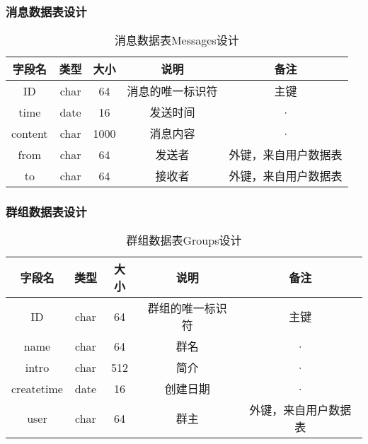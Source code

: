 \subsubsection{消息数据表设计}
\begin{table}[htbp]
	\centering
	\caption{消息数据表Messages设计} \label{tab:message-database}
	\begin{tabular}{|c|c|c|c|c|}
		\hline
		字段名  & 类型 & 大小 & 说明             & 备注                 \\
		\hline
		ID      & char & 64   & 消息的唯一标识符 & 主键                 \\
		\hline
		time    & date & 16   & 发送时间         & ·                    \\
		\hline
		content & char & 1000 & 消息内容         & ·                    \\
		\hline
		from    & char & 64   & 发送者           & 外键，来自用户数据表 \\
		\hline
		to      & char & 64   & 接收者           & 外键，来自用户数据表 \\
		\hline
	\end{tabular}
\end{table}


\subsubsection{群组数据表设计}
\begin{table}[htbp]
	\centering
	\caption{群组数据表Groups设计} \label{tab:group-database}
	\begin{tabular}{|c|c|c|c|c|}
		\hline
		字段名     & 类型 & 大小 & 说明             & 备注                 \\
		\hline
		ID         & char & 64   & 群组的唯一标识符 & 主键                 \\
		\hline
        name       & char & 64   & 群名             & ·                    \\
        \hline
		intro      & char & 512  & 简介             & ·                    \\
		\hline
		createtime & date & 16   & 创建日期         & ·                    \\
		\hline
		user       & char & 64   & 群主             & 外键，来自用户数据表 \\
		\hline
	\end{tabular}
\end{table}


